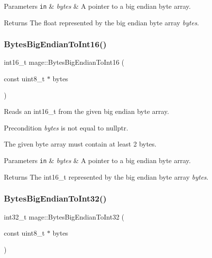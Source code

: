 \begin{DoxyParams}[1]{Parameters}
\mbox{\tt in}  & {\em bytes} & A pointer to a big endian byte array. \\
\hline
\end{DoxyParams}
\begin{DoxyReturn}{Returns}
The {\ttfamily float} represented by the big endian byte array {\itshape bytes}. 
\end{DoxyReturn}
\hypertarget{namespacemage_adc57d989fb23987341f5a52546276d6d}{}\label{namespacemage_adc57d989fb23987341f5a52546276d6d} 
\subsubsection{\texorpdfstring{Bytes\+Big\+Endian\+To\+Int16()}{BytesBigEndianToInt16()}}
{\footnotesize\ttfamily int16\+\_\+t mage\+::\+Bytes\+Big\+Endian\+To\+Int16 (\begin{DoxyParamCaption}\item[{const uint8\+\_\+t $\ast$}]{bytes }\end{DoxyParamCaption})\hspace{0.3cm}{\ttfamily [noexcept]}}

Reads an int16\+\_\+t from the given big endian byte array.

\begin{DoxyPrecond}{Precondition}
{\itshape bytes} is not equal to {\ttfamily nullptr}. 

The given byte array must contain at least 2 bytes. 
\end{DoxyPrecond}

\begin{DoxyParams}[1]{Parameters}
\mbox{\tt in}  & {\em bytes} & A pointer to a big endian byte array. \\
\hline
\end{DoxyParams}
\begin{DoxyReturn}{Returns}
The {\ttfamily int16\+\_\+t} represented by the big endian byte array {\itshape bytes}. 
\end{DoxyReturn}
\hypertarget{namespacemage_a02236b9125c77b420301aff3aa83594e}{}\label{namespacemage_a02236b9125c77b420301aff3aa83594e} 
\subsubsection{\texorpdfstring{Bytes\+Big\+Endian\+To\+Int32()}{BytesBigEndianToInt32()}}
{\footnotesize\ttfamily int32\+\_\+t mage\+::\+Bytes\+Big\+Endian\+To\+Int32 (\begin{DoxyParamCaption}\item[{const uint8\+\_\+t $\ast$}]{bytes }\end{DoxyParamCaption})\hspace{0.3cm}{\ttfamily [noexcept]}}

